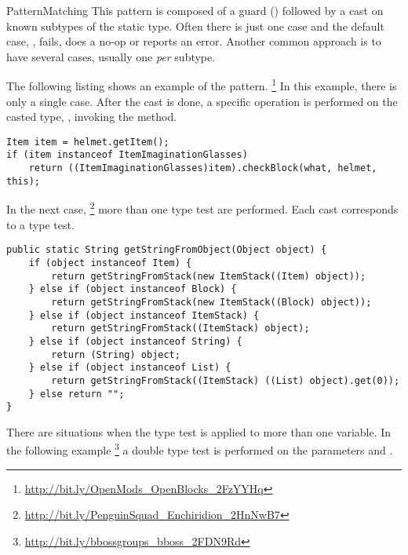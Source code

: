 \begin{pattern}{PatternMatching}
This pattern is composed of a guard () followed by a cast on known subtypes of the static type.
Often there is just one case and the default case, \ie,  fails, does a no-op or reports an error.
Another common approach is to have several cases,
usually one \emph{per} subtype.

\instances{}
The following listing shows an example of the \thisp{} pattern.%
\footnote{\url{http://bit.ly/OpenMods_OpenBlocks_2FzYYHq}}
In this example, there is only a single case.
After the cast is done, a specific operation is performed on the casted type, \ie, invoking the  method.

\begin{verbatim}
Item item = helmet.getItem();
if (item instanceof ItemImaginationGlasses)
	return ((ItemImaginationGlasses)item).checkBlock(what, helmet, this);
\end{verbatim}

In the next case,%
\footnote{\url{http://bit.ly/PenguinSquad_Enchiridion_2HnNwB7}}
more than one type test are performed.
Each cast corresponds to a type test.

\begin{verbatim}
public static String getStringFromObject(Object object) {
	if (object instanceof Item) {
		return getStringFromStack(new ItemStack((Item) object));
	} else if (object instanceof Block) {
		return getStringFromStack(new ItemStack((Block) object));
	} else if (object instanceof ItemStack) {
		return getStringFromStack((ItemStack) object);
	} else if (object instanceof String) {
		return (String) object;
	} else if (object instanceof List) {
		return getStringFromStack((ItemStack) ((List) object).get(0));
	} else return "";
}
\end{verbatim}

There are situations when the type test is applied to more than one variable.
In the following example%
\footnote{\url{http://bit.ly/bbossgroups_bboss_2FDN9Rd}}
a double type test is performed on the parameters  and .


\end{pattern}
